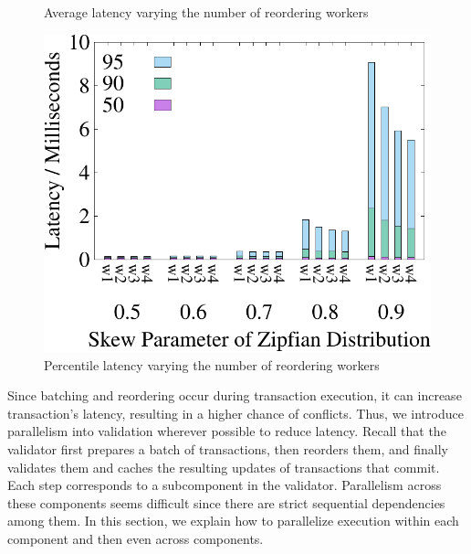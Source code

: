 \begin{figure}[!htbp]
\begin{minipage}[b]{0.31\linewidth}
		\caption{Average latency varying the number of reordering workers}
		\label{fig:reorder:latency}
	\end{minipage}    
	\begin{minipage}[b]{0.31\linewidth}
		\centering
		\includegraphics[width=\textwidth]{./exp_fig/reorder/percent95_latency}
		\caption{Percentile latency varying the number of reordering workers}
		\label{fig:reorder:p95}
	\end{minipage}    
\end{figure}


Since batching and reordering occur during transaction execution, it can increase transaction's latency, 
resulting in a higher chance of conflicts. Thus, we introduce parallelism into validation wherever possible to reduce latency.
Recall that the validator first prepares a batch of transactions, then reorders them,  
and finally validates them and caches the resulting updates of transactions that commit.
 Each step corresponds to a subcomponent in the validator. Parallelism across these components seems difficult since there are strict sequential dependencies among them. In this section, we explain how to parallelize execution within each component and then even across components.


